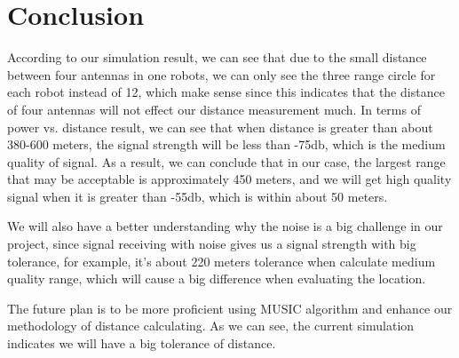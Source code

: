 \section{Conclusion}
\indent 
	According to our simulation result, we can see that due to the small distance between four antennas in one robots, we can only see the three range circle for each robot instead of 12, which make sense since this indicates that the distance of four antennas will not effect our distance measurement much. In terms of power vs. distance result, we can see that when distance is greater than about 380-600 meters, the signal strength will be less than -75db, which is the medium quality of signal. As a result, we can conclude that in our case, the largest range that may be acceptable is approximately 450 meters, and we will get high quality signal when it is greater than -55db, which is within about 50 meters. 
\par
	We will also have a better understanding why the noise is a big challenge in our project, since signal receiving with noise gives us a signal strength with big tolerance, for example, it's about 220 meters tolerance when calculate medium quality range, which will cause a big difference when evaluating the location.
\par
	The future plan is to be more proficient using MUSIC algorithm and enhance our methodology of distance calculating. As we can see, the current simulation indicates we will have a big tolerance of distance.

